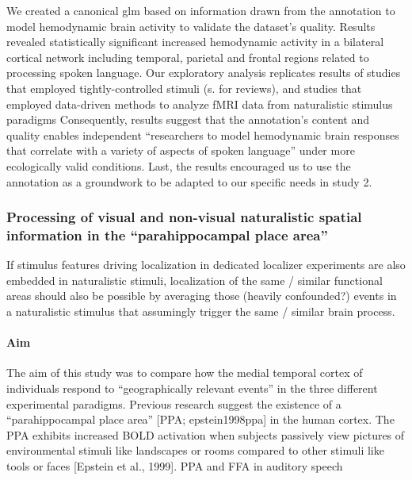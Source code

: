 We created a canonical \ac{glm} based on information drawn from the annotation
to model hemodynamic brain activity to validate the dataset's quality.
Results revealed statistically significant increased hemodynamic activity in a
bilateral cortical network including temporal, parietal and frontal regions
related to processing spoken language.
Our exploratory analysis replicates results of studies that employed
tightly-controlled stimuli (s. \citep{friederici2011brain,
hickok2007cortical,price2012twentyyears} for reviews), and studies that employed
data-driven methods to analyze \ac{fMRI} data from naturalistic stimulus
paradigms \citep{honey2012not, lerner2011topographic, silbert2014coupled}
Consequently, results suggest that the annotation's content and quality enables
independent ``researchers to model hemodynamic brain responses that correlate
with a variety of aspects of spoken language'' \citep{haeusler2021speechanno}
under more ecologically valid conditions.
Last, the results encouraged us to use the annotation as a groundwork to be
adapted to our specific needs in study 2.


\subsubsection{Processing of visual and non-visual naturalistic spatial
information in the ``parahippocampal place area''}


%

%
If stimulus features driving localization in dedicated localizer experiments are
also embedded in naturalistic stimuli, localization of the same / similar
functional areas should also be possible by averaging those (heavily
confounded?) events in a naturalistic stimulus that assumingly trigger the same
/ similar brain process.

%
\paragraph{Aim}

%
The aim of this study was to compare how the medial temporal cortex of
individuals respond to “geographically relevant events” in the  three different
experimental paradigms.
%
Previous research suggest the existence of a ``parahippocampal place area'' [PPA;
epstein1998ppa] in the human cortex.
%
The PPA exhibits increased BOLD activation
when subjects passively view pictures of environmental stimuli like landscapes
or rooms compared to other stimuli like tools or faces [Epstein et al., 1999].
PPA and FFA in auditory speech \citep{aziz2008modulation}

